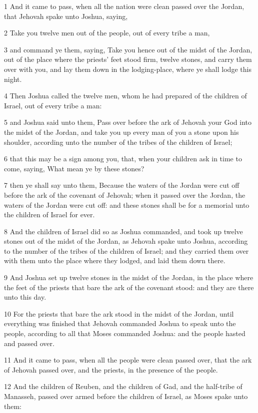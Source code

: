 \par 1 And it came to pass, when all the nation were clean passed over the Jordan, that Jehovah spake unto Joshua, saying,
\par 2 Take you twelve men out of the people, out of every tribe a man,
\par 3 and command ye them, saying, Take you hence out of the midst of the Jordan, out of the place where the priests' feet stood firm, twelve stones, and carry them over with you, and lay them down in the lodging-place, where ye shall lodge this night.
\par 4 Then Joshua called the twelve men, whom he had prepared of the children of Israel, out of every tribe a man:
\par 5 and Joshua said unto them, Pass over before the ark of Jehovah your God into the midst of the Jordan, and take you up every man of you a stone upon his shoulder, according unto the number of the tribes of the children of Israel;
\par 6 that this may be a sign among you, that, when your children ask in time to come, saying, What mean ye by these stones?
\par 7 then ye shall say unto them, Because the waters of the Jordan were cut off before the ark of the covenant of Jehovah; when it passed over the Jordan, the waters of the Jordan were cut off: and these stones shall be for a memorial unto the children of Israel for ever.
\par 8 And the children of Israel did so as Joshua commanded, and took up twelve stones out of the midst of the Jordan, as Jehovah spake unto Joshua, according to the number of the tribes of the children of Israel; and they carried them over with them unto the place where they lodged, and laid them down there.
\par 9 And Joshua set up twelve stones in the midst of the Jordan, in the place where the feet of the priests that bare the ark of the covenant stood: and they are there unto this day.
\par 10 For the priests that bare the ark stood in the midst of the Jordan, until everything was finished that Jehovah commanded Joshua to speak unto the people, according to all that Moses commanded Joshua: and the people hasted and passed over.
\par 11 And it came to pass, when all the people were clean passed over, that the ark of Jehovah passed over, and the priests, in the presence of the people.
\par 12 And the children of Reuben, and the children of Gad, and the half-tribe of Manasseh, passed over armed before the children of Israel, as Moses spake unto them:
